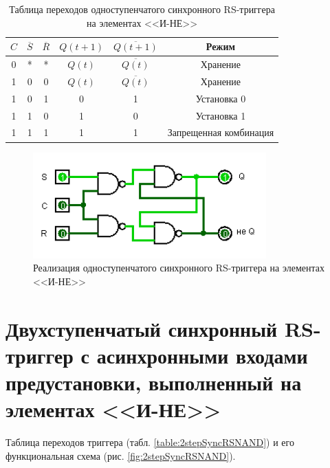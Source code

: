 \documentclass{mirea}
\begin{document}
	\begin{table}[H]
		\centering
		\caption{Таблица переходов одноступенчатого синхронного RS-триггера на элементах <<И-НЕ>>}
		\label{table:1stepSyncRSNAND}
		\begin{tabular}{c|c|c|c|c|c}
			$ C $ & $ \overline{S} $ & $ \overline{R} $ & $ Q(t+1) $ & $ \overline{Q(t+1)} $ & Режим \\
			\hline
			0 & * & * & $ Q(t) $ & $\overline{Q(t)}$ & Хранение \\
			\hline
			1 & 0 & 0 & $ Q(t) $ & $\overline{Q(t)}$ & Хранение \\
			\hline
			1 & 0 & 1 & 0 & 1 & Установка 0 \\
			\hline
			1 & 1 & 0 & 1 & 0 & Установка 1 \\
			\hline
			1 & 1 & 1 & 1 & 1 & Запрещенная комбинация
		\end{tabular}
	\end{table}
	
	\begin{figure}[H]
		\centering
		\includegraphics[width=0.8\textwidth]{1stepSyncRSNAND.png}
		\caption{Реализация одноступенчатого синхронного RS-триггера на элементах <<И-НЕ>>}
		\label{fig:1stepSyncRSNAND}
	\end{figure}

\clearpage
\section{Двухступенчатый синхронный RS-триггер с асинхронными входами предустановки, выполненный на элементах <<И-НЕ>>}
	Таблица переходов триггера (табл. \ref{table:2stepSyncRSNAND}) и его функциональная схема (рис. \ref{fig:2stepSyncRSNAND}).
	
\end{document}
